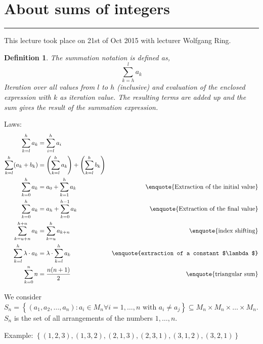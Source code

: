 \documentclass[a4paper,landscape,twocolumn]{article}
\newtheorem{defi}{Definition}
\newcommand\set[1]{\left\{#1\right\}}
\newcommand\meta[3]{\hrule{} This #1 took place on #2 with lecturer #3.\par}
\begin{document}
\section{About sums of integers}
\meta{lecture}{21st of Oct 2015}{Wolfgang Ring}

\begin{defi}
  The summation notation is defined as,
  \[ \sum_{k=h}^{l} a_k \]
  Iteration over all values from $l$ to $h$ (inclusive) and evaluation of
  the enclosed expression with $k$ as iteration value. The resulting terms
  are added up and the sum gives the result of the summation expression.
\end{defi}

Laws:
\begin{align}
    \sum_{k=l}^{h} a_k &= \sum_{i=l}^h a_i \\
    \sum_{k=l}^{h} (a_k + b_k)
        &= \left(\sum_{k=l}^h a_k\right) + \left(\sum_{k=l}^h b_k\right) \\
    \sum_{k=0}^{h} a_k
        &= a_0 + \sum_{k=1}^{h} a_k
        & \text{\enquote{Extraction of the initial value}} \\
    \sum_{k=0}^{h} a_k
        &= a_{h} + \sum_{k=0}^{h-1} a_k
        & \text{\enquote{Extraction of the final value}} \\
    \sum_{k=u+n}^{h+n} a_k
        &= \sum_{k=u}^{h} a_{k+n}
        & \text{\enquote{index shifting}} \\
    \sum_{k=l}^h \lambda \cdot a_k
        &= \lambda \cdot \sum_{k=l}^h a_k
        & \text{\enquote{extraction of a constant $\lambda$}} \\
    \sum_{k=0}^n n
        &= \frac{n (n+1)}{2}
        & \text{\enquote{triangular sum}}
\end{align}

We consider $S_n = \set{(a_1, a_2, \ldots, a_n): a_i \in M_n \forall i = 1, \ldots, n
\text{ with } a_i \neq a_j} \subseteq M_n \times M_n \times \dots \times M_n$.
$S_n$ is the set of all arrangements of the numbers $1, \ldots, n$.

Example: $\set{(1,2,3), (1, 3, 2), (2, 1, 3), (2, 3, 1), (3, 1, 2), (3, 2, 1)}$
\end{document}
